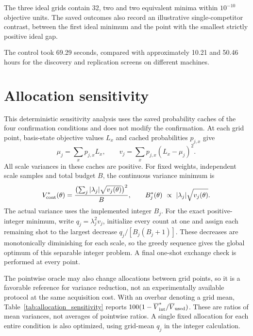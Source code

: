 The three ideal grids contain 32, two and two equivalent minima within $10^{-10}$ objective units. The saved outcomes also record an illustrative single-competitor contrast, between the first ideal minimum and the point with the smallest strictly positive ideal gap.

The control took 69.29 seconds, compared with approximately 10.21 and 50.46 hours for the discovery and replication screens on different machines.

\section{Allocation sensitivity}\label{app:allocation}
\label{sec:allocation_sensitivity}
This deterministic sensitivity analysis uses the saved probability caches of the four confirmation conditions and does not modify the confirmation. At each grid point, basis-state objective values $L_x$ and cached probabilities $p_{j,x}$ give
\[
 \mu_j=\sum_x p_{j,x}L_x,\qquad
 v_j=\sum_xp_{j,x}(L_x-\mu_j)^2.
\]
All scale variances in these caches are positive. For fixed weights, independent scale samples and total budget $B$, the continuous variance minimum is
\[
 V_{\rm cont}^*(\theta)=
 \frac{\bigl(\sum_j|\lambda_j|\sqrt{v_j(\theta)}\bigr)^2}{B},
 \qquad B_j^*(\theta)\ \propto\ |\lambda_j|\sqrt{v_j(\theta)}.
\]
The actual variance uses the implemented integer $B_j$. For the exact positive-integer minimum, write $q_j=\lambda_j^2v_j$, initialize every count at one and assign each remaining shot to the largest decrease $q_j/[B_j(B_j+1)]$. These decreases are monotonically diminishing for each scale, so the greedy sequence gives the global optimum of this separable integer problem. A final one-shot exchange check is performed at every point.

The pointwise oracle may also change allocations between grid points, so it is a favorable reference for variance reduction, not an experimentally available protocol at the same acquisition cost. With an overbar denoting a grid mean, Table~\ref{tab:allocation_sensitivity} reports $100(1-\overline V_{\rm int}^*/\overline V_{\rm used})$. These are ratios of mean variances, not averages of pointwise ratios. A single fixed allocation for each entire condition is also optimized, using grid-mean $q_j$ in the integer calculation.

